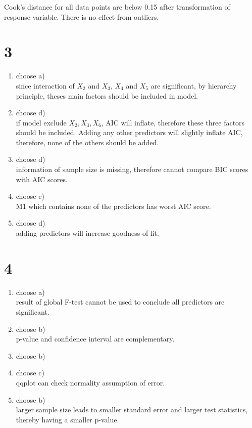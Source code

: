 \documentclass[11pt,letterpaper]{article}
\begin{document}
\noindent Cook's distance for all data points are below 0.15 after transformation of response variable. There is no effect from outliers. 

\section*{3}

\begin{enumerate}[label=(\alph*)]
\item choose a) \\
since interaction of $X_2$ and $ X_3$, $ X_4$ and $ X_5$ are significant, by hierarchy principle, theses main factors should be included in model. 

\item choose d) \\
if model exclude $X_2, X_3, X_6$, AIC will inflate, therefore these three factors should be included. Adding any other predictors will slightly inflate AIC, therefore, none of the others should be added. 

\item choose d) \\
information of sample size is missing, therefore cannot compare BIC scores with AIC scores.

\item choose c) \\
M1 which contains none of the predictors has worst AIC score. 

\item choose d) \\
adding predictors will increase goodness of fit. 

\end{enumerate}

\section*{4}

\begin{enumerate}[label=(\alph*)]
\item choose a) \\
result of global F-test cannot be used to conclude all predictors are significant. 

\item choose b) \\
p-value and confidence interval are complementary. 

\item choose b) 

\item choose c) \\
qqplot can check normality assumption of error. 

\item choose b) \\
larger sample size leads to smaller standard error and larger test statistics, thereby having a smaller p-value. 


\end{enumerate}
\end{document}
